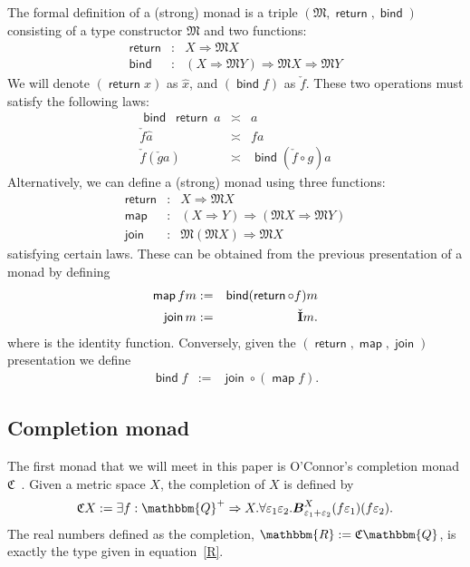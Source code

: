 \documentclass{elsarticle}
\newcommand{\assign}{:=}
\newcommand{\tmmathbf}[1]{\ensuremath{\boldsymbol{#1}}}
\newcommand{\tmop}[1]{\ensuremath{\operatorname{#1}}}
\newcommand{\tmstrong}[1]{\textbf{#1}}
\newcommand{\tmtextup}[1]{{\upshape{#1}}}
\newcommand{\upl}{+}
\newcommand{\ballsym}{\ensuremath{\tmmathbf{B}}}
\newcommand{\ball}[4]{\ensuremath{\ballsym^{#1}_{#2}  #3  #4}}
\newcommand{\complete}{\ensuremath{\mathfrak{C}}}
\newcommand{\id}{\text{{\tmstrong{\tmtextup{I}}}}}
\begin{document}
The formal definition of a (strong) monad is a triple $(\mathfrak{M},
\tmop{\mathsf{return}}, \tmop{\mathsf{bind}})$ consisting of a type
constructor $\mathfrak{M}$ and two functions:
\begin{eqnarray}
  \tmop{\mathsf{return}} & : & X \Rightarrow \mathfrak{M}X \nonumber\\
  \tmop{\mathsf{bind}} & : & (X \Rightarrow \mathfrak{M}Y) \Rightarrow \mathfrak{M}X
  \Rightarrow \mathfrak{M}Y \nonumber
\end{eqnarray}
We will denote $( \tmop{\mathsf{return}} x)$ as $\hat{x}$, and $(
\tmop{\mathsf{bind}} f)$ as $\check{f}$. These two operations must satisfy the
following laws:
\begin{eqnarray}
  \tmop{\mathsf{bind}}\ \tmop{\mathsf{return}}\ a & \asymp & a \nonumber\\
  \check{f}  \hat{a}  & \asymp & f a \nonumber\\
  \check{f} ( \check{g} a) & \asymp & \tmop{\mathsf{bind}} ( \check{f} \circ
  g) a \nonumber
\end{eqnarray}
Alternatively, we can define a (strong) monad using three functions:
\begin{eqnarray}
  \tmop{\mathsf{return}} & : & X \Rightarrow \mathfrak{M}X \nonumber\\
  \tmop{\mathsf{map}} & : & (X \Rightarrow Y) \Rightarrow (\mathfrak{M}X
  \Rightarrow \mathfrak{M}Y) \nonumber\\
  \tmop{\mathsf{join}} & : & \mathfrak{M}(\mathfrak{M}X) \Rightarrow
  \mathfrak{M}X \nonumber
\end{eqnarray}
satisfying certain laws. These can be obtained from the previous presentation
of a monad by defining
\begin{eqnarray}
  \tmop{\mathsf{map}} f m & \assign & \tmop{\mathsf{bind}} (
  \tmop{\mathsf{return}} \circ f) m \nonumber\\
  \tmop{\mathsf{join}} m & \assign & \check{\id} m. \nonumber
\end{eqnarray}
where {\id} is the identity function. Conversely, given the $(
\tmop{\mathsf{return}}, \tmop{\mathsf{map}}, \tmop{\mathsf{join}})$
presentation we define
\begin{eqnarray}
  \tmop{\mathsf{bind}} f & \assign & \tmop{\mathsf{join}} \circ (
  \tmop{\mathsf{map}} f) . \nonumber
\end{eqnarray}
\subsection{Completion monad\label{ss:completion-monad}}The first monad that
we will meet in this paper is O'Connor's completion monad
$\complete$~{\cite{OConnor:mscs}}. Given a metric space $X$, the completion of
$X$ is defined by
\[ \complete X \assign \exists f : \mathbbm{Q}^{\upl} \Rightarrow X. \forall
   \varepsilon_1 \varepsilon_2 . \ball{X}{\varepsilon_1 + \varepsilon_2}{(f
   \varepsilon_1)}{(f \varepsilon_2)} . \]
The real numbers defined as the completion, $\mathbbm{R} \assign \complete
\mathbbm{Q}$, is exactly the type given in equation~\ref{R}.
\end{document}
